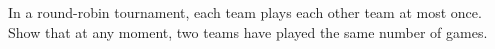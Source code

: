In a round-robin tournament, each team plays each other team at most once. Show that at any moment, two teams have played the same number of games.

